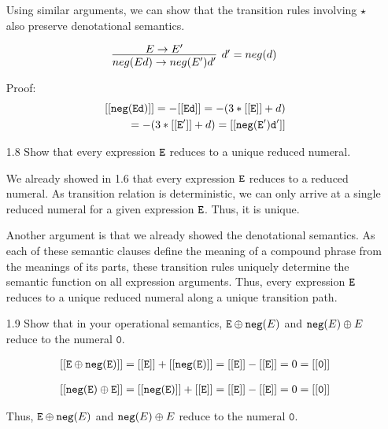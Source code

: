 \documentclass{article}
\begin{document}
\begin{enumerate}
Using similar arguments, we can show that the transition rules involving $\star$
also preserve denotational semantics.

\[
\infer[d' = neg(d)] 
  {neg(Ed) \rightarrow neg(E')d'}  
  {E \rightarrow E'}    
\]

Proof:
\begin{align}
\mathtt{[[{neg(Ed)}]]}  
            = -\mathtt{[[{Ed}]]} 
            = -(3 * \mathtt{[[{E}]]} + d) \\
            = -(3 * \mathtt{[[{E'}]]} + d) 
            = \mathtt{[[{neg(E')d'}]]}       
\end{align}

\item[1.8] Show that every expression $\mathtt{E}$ reduces to a unique reduced numeral.

We already showed in 1.6 that every expression $\mathtt{E}$ reduces to a reduced numeral.
As transition relation is deterministic, we can only arrive at a single reduced
numeral for a given expression $\mathtt{E}$. Thus, it is unique.

Another argument is that we already showed the denotational semantics.
As each of these semantic clauses define the meaning of a compound phrase from 
the meanings of its parts, these transition rules uniquely determine the semantic
function on all expression arguments. Thus, every expression $\mathtt{E}$ reduces to a 
unique reduced numeral along a unique transition path.


\item[1.9] Show that in your operational semantics, $\mathtt{E} \oplus \mathtt{neg}(E)$ and 
$\mathtt{neg}(E) \oplus E$ reduce to the numeral $\mathtt{0}$.

\begin{align}
\mathtt{[[{E \oplus \mathtt{neg}(E)}]]}
	= \mathtt{[[{E}]]} + \mathtt{[[{\mathtt{neg}(E)}]]}
	= \mathtt{[[{E}]]} - \mathtt{[[{E}]]}
	= 0	
	= \mathtt{[[{0}]]}
\end{align}

\begin{align}
\mathtt{[[{\mathtt{neg}(E) \oplus E}]]}
	= \mathtt{[[{\mathtt{neg}(E)}]]} + \mathtt{[[{E}]]}
	= \mathtt{[[{E}]]} - \mathtt{[[{E}]]}
	= 0	
	= \mathtt{[[{0}]]}	
\end{align}

Thus, $\mathtt{E} \oplus \mathtt{neg}(E)$ and $\mathtt{neg}(E) \oplus E$ reduce to the 
numeral $\mathtt{0}$.



\end{enumerate}
\end{document}
